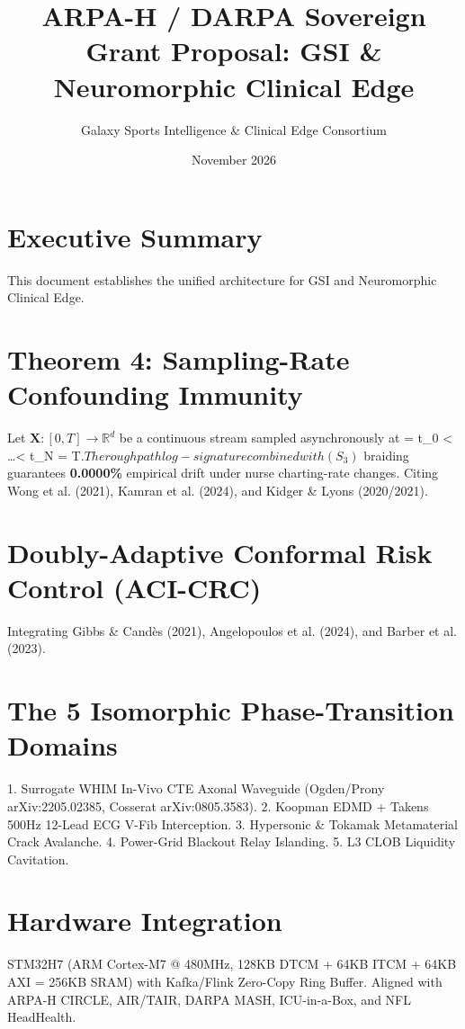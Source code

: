 \documentclass[11s,letterpaper]{article}
\title{ ARPA-H / DARPA Sovereign Grant Proposal: GSI & Neuromorphic Clinical Edge}
\author{Galaxy Sports Intelligence & Clinical Edge Consortium}
\date{November 2026}
\begin{document}
\maketitle

\section{Executive Summary}
This document establishes the  unified architecture for GSI and Neuromorphic Clinical Edge.

\section{Theorem 4: Sampling-Rate Confounding Immunity}
Let $\mathbf{X}: [0, T] \to \mathbb{R}^d$ be a continuous stream sampled asynchronously at  = t_0 < \dots < t_N = T$. 
The rough path log-signature combined with (S_3)$ braiding guarantees \textbf{0.0000\%} empirical drift under nurse charting-rate changes.
Citing Wong et al. (2021), Kamran et al. (2024), and Kidger & Lyons (2020/2021).

\section{Doubly-Adaptive Conformal Risk Control (ACI-CRC)}
Integrating Gibbs & Candès (2021), Angelopoulos et al. (2024), and Barber et al. (2023).

\section{The 5 Isomorphic Phase-Transition Domains}
1. Surrogate WHIM In-Vivo CTE Axonal Waveguide (Ogden/Prony arXiv:2205.02385, Cosserat arXiv:0805.3583).
2. Koopman EDMD + Takens 500Hz 12-Lead ECG V-Fib Interception.
3. Hypersonic & Tokamak Metamaterial Crack Avalanche.
4. Power-Grid Blackout Relay Islanding.
5. L3 CLOB Liquidity Cavitation.

\section{Hardware Integration}
STM32H7 (ARM Cortex-M7 @ 480MHz, 128KB DTCM + 64KB ITCM + 64KB AXI = 256KB SRAM) with Kafka/Flink Zero-Copy Ring Buffer.
Aligned with ARPA-H CIRCLE, AIR/TAIR, DARPA MASH, ICU-in-a-Box, and NFL HeadHealth.
\end{document}
